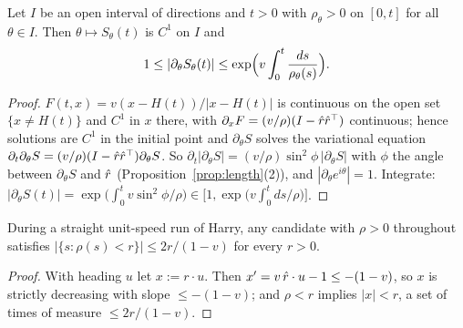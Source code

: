 \begin{lemma}[W1: stretch]\label{lem:D3-W1}
Let $I$ be an open interval of directions and $t>0$ with $\rho_\theta>0$ on $[0,t]$ for all $\theta\in I$. Then
$\theta\mapsto S_\theta(t)$ is $C^1$ on $I$ and
\[
1\le|\partial_\theta S_\theta(t)|\le\exp\Bigl(v\int_0^t\frac{ds}{\rho_\theta(s)}\Bigr).
\]
\end{lemma}
\begin{proof}
$F(t,x)=v(x-H(t))/|x-H(t)|$ is continuous on the open set $\{x\ne H(t)\}$ and $C^1$ in $x$ there, with
$\partial_xF=(v/\rho)(I-\hat r\hat r^{\top})$ continuous; hence solutions are $C^1$ in the initial point and $\partial_\theta S$ solves
the variational equation $\partial_t\partial_\theta S=(v/\rho)(I-\hat r\hat r^{\top})\partial_\theta S$. So
$\partial_t|\partial_\theta S|=(v/\rho)\sin^2\!\phi\,|\partial_\theta S|$ with $\phi$ the angle between $\partial_\theta S$ and $\hat r$
(Proposition~\ref{prop:length}(2)), and $|\partial_\theta e^{i\theta}|=1$. Integrate:
$|\partial_\theta S(t)|=\exp\bigl(\int_0^t v\sin^2\!\phi/\rho\bigr)\in\bigl[1,\exp\bigl(v\int_0^t ds/\rho\bigr)\bigr]$.
\end{proof}

\begin{lemma}\label{lem:D3-W2}
During a straight unit-speed run of Harry, any candidate with $\rho>0$ throughout satisfies
$|\{s:\rho(s)<r\}|\le2r/(1-v)$ for every $r>0$.
\end{lemma}
\begin{proof}
With heading $u$ let $x:=r\cdot u$. Then $x'=v\,\hat r\cdot u-1\le-(1-v)$, so $x$ is strictly decreasing with slope $\le-(1-v)$; and
$\rho<r$ implies $|x|<r$, a set of times of measure $\le2r/(1-v)$.
\end{proof}

